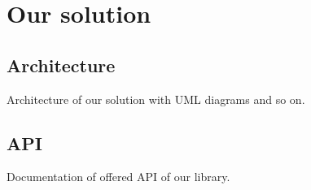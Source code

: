 \chapter{Our solution}\label{chap:oursolution}

\section{Architecture}\label{sec:architecture}

Architecture of our solution with UML diagrams and so on.

\section{API}\label{sec:api}

Documentation of offered API of our library.

